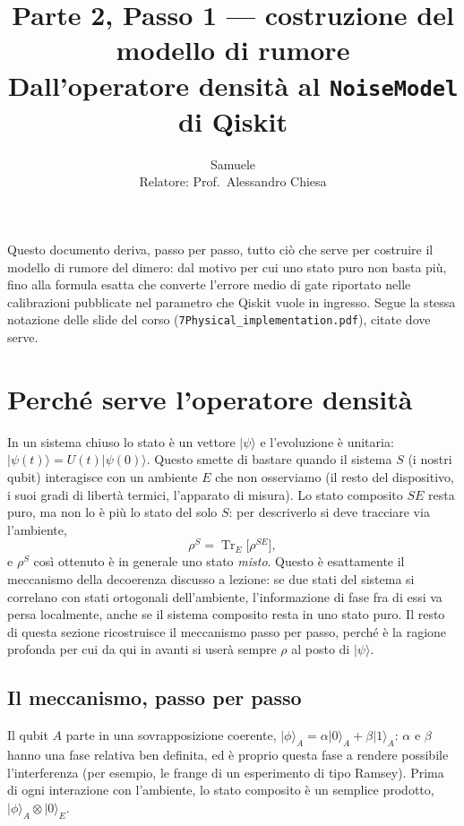 \documentclass[11pt,a4paper]{article}
\title{Parte 2, Passo 1 --- costruzione del modello di rumore\\
\large Dall'operatore densità al \texttt{NoiseModel} di Qiskit}
\author{Samuele \\ Relatore: Prof.\ Alessandro Chiesa}
\date{}
\newcommand{\ket}[1]{\lvert #1 \rangle}
\newcommand{\Tr}{\operatorname{Tr}}
\begin{document}
\maketitle
\tableofcontents

\bigskip
\noindent Questo documento deriva, passo per passo, tutto ciò che serve per costruire
il modello di rumore del dimero: dal motivo per cui uno stato puro non basta più, fino
alla formula esatta che converte l'errore medio di gate riportato nelle calibrazioni
pubblicate nel parametro che Qiskit vuole in ingresso. Segue la stessa notazione delle
slide del corso (\texttt{7Physical\_\allowbreak implementation.pdf}), citate dove serve.

\section{Perché serve l'operatore densità}
\label{sec:decoerenza}

In un sistema chiuso lo stato è un vettore $\ket{\psi}$ e l'evoluzione è unitaria:
$\ket{\psi(t)}=U(t)\ket{\psi(0)}$. Questo smette di bastare quando il sistema $S$ (i
nostri qubit) interagisce con un ambiente $E$ che non osserviamo (il resto del
dispositivo, i suoi gradi di libertà termici, l'apparato di misura). Lo stato
composito $SE$ resta puro, ma non lo è più lo stato del solo $S$: per descriverlo si
deve tracciare via l'ambiente,
\begin{equation}
\rho^S = \Tr_E\!\big[\rho^{SE}\big],
\end{equation}
e $\rho^S$ così ottenuto è in generale uno stato \emph{misto}. Questo è esattamente il
meccanismo della decoerenza discusso a lezione: se due stati del sistema si
correlano con stati ortogonali dell'ambiente, l'informazione di fase fra di essi va
persa localmente, anche se il sistema composito resta in uno stato puro. Il resto di
questa sezione ricostruisce il meccanismo passo per passo, perché è la ragione
profonda per cui da qui in avanti si userà sempre $\rho$ al posto di $\ket\psi$.

\subsection{Il meccanismo, passo per passo}

Il qubit $A$ parte in una sovrapposizione coerente,
$\ket{\phi}_A=\alpha\ket0_A+\beta\ket1_A$: $\alpha$ e $\beta$ hanno una fase relativa
ben definita, ed è proprio questa fase a rendere possibile l'interferenza (per
esempio, le frange di un esperimento di tipo Ramsey). Prima di ogni interazione con
l'ambiente, lo stato composito è un semplice prodotto, $\ket\phi_A\otimes\ket0_E$.
\end{document}
